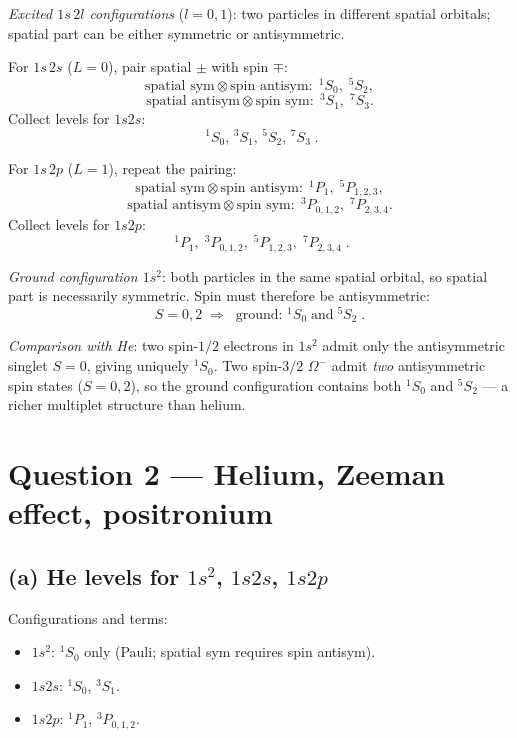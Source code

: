\documentclass[11pt]{article}
\begin{document}
\textit{Excited $1s\,2l$ configurations} ($l=0,1$): two particles in different spatial orbitals; spatial part can be either symmetric or antisymmetric.

For $1s\,2s$ ($L=0$), pair spatial $\pm$ with spin $\mp$:
\[
\text{spatial sym}\otimes\text{spin antisym}: \;{}^1S_0,\;{}^5S_2,
\]
\[
\text{spatial antisym}\otimes\text{spin sym}: \;{}^3S_1,\;{}^7S_3.
\]
Collect levels for $1s2s$:
\[
\boxed{\;{}^1S_0,\,{}^3S_1,\,{}^5S_2,\,{}^7S_3\;}.
\]

For $1s\,2p$ ($L=1$), repeat the pairing:
\[
\text{spatial sym}\otimes\text{spin antisym}: \;{}^1P_1,\;{}^5P_{1,2,3},
\]
\[
\text{spatial antisym}\otimes\text{spin sym}: \;{}^3P_{0,1,2},\;{}^7P_{2,3,4}.
\]
Collect levels for $1s2p$:
\[
\boxed{\;{}^1P_1,\;{}^3P_{0,1,2},\;{}^5P_{1,2,3},\;{}^7P_{2,3,4}\;}.
\]

\textit{Ground configuration $1s^2$}: both particles in the same spatial orbital, so spatial part is necessarily symmetric. Spin must therefore be antisymmetric:
\[
S=0,2 \;\Rightarrow\; \boxed{\;\text{ground: }{}^1S_0\;\text{and}\;{}^5S_2\;}.
\]

\textit{Comparison with He}: two spin-$1/2$ electrons in $1s^2$ admit only the antisymmetric singlet $S=0$, giving uniquely ${}^1S_0$. Two spin-$3/2$ $\Omega^-$ admit \emph{two} antisymmetric spin states ($S=0,2$), so the ground configuration contains both ${}^1S_0$ and ${}^5S_2$ --- a richer multiplet structure than helium.

\section*{Question 2 --- Helium, Zeeman effect, positronium}

\subsection*{(a) He levels for $1s^2$, $1s2s$, $1s2p$}

Configurations and terms:
\begin{itemize}
\item $1s^2$: ${}^1S_0$ only (Pauli; spatial sym requires spin antisym).
\item $1s2s$: ${}^1S_0$, ${}^3S_1$.
\item $1s2p$: ${}^1P_1$, ${}^3P_{0,1,2}$.
\end{itemize}
\end{document}
